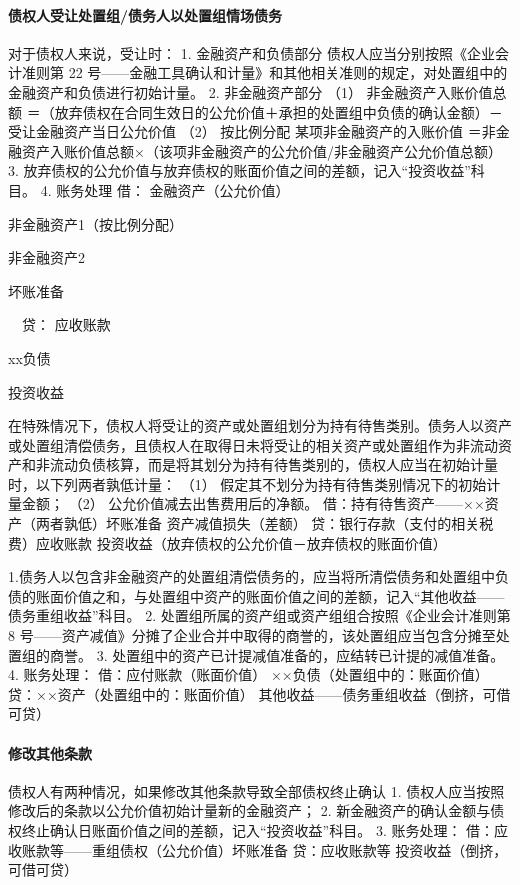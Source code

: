 \documentclass[UTF8,12pt]{ctexart}
\newenvironment{Dr}{\noindent 借：}{\par}
\newenvironment{Cr}{\noindent \ \ 贷：}{\par}
\numberwithin{equation}{section} %
\numberwithin{figure}{section}
\numberwithin{table}{section}
\begin{document}
	\paragraph{债权人受让处置组/债务人以处置组情场债务}
	对于债权人来说，受让时：
	1.	金融资产和负债部分
	债权人应当分别按照《企业会计准则第 22 号——金融工具确认和计量》和其他相关准则的规定，对处置组中的金融资产和负债进行初始计量。
	2.	非金融资产部分
	（1）	非金融资产入账价值总额
	＝（放弃债权在合同生效日的公允价值＋承担的处置组中负债的确认金额）－受让金融资产当日公允价值
	（2）	按比例分配
	某项非金融资产的入账价值
	＝非金融资产入账价值总额×（该项非金融资产的公允价值/非金融资产公允价值总额）
	3.	放弃债权的公允价值与放弃债权的账面价值之间的差额，记入“投资收益”科目。
	4.	账务处理
	\begin{Dr}
		金融资产（公允价值）
		
		非金融资产1（按比例分配）
		
		非金融资产2
		
		坏账准备
	\end{Dr}
	\begin{Cr}
		应收账款
		
		xx负债
		
		投资收益
	\end{Cr}
	
	在特殊情况下，债权人将受让的资产或处置组划分为持有待售类别。债务人以资产或处置组清偿债务，且债权人在取得日未将受让的相关资产或处置组作为非流动资产和非流动负债核算，而是将其划分为持有待售类别的，债权人应当在初始计量时，以下列两者孰低计量：
	（1）	假定其不划分为持有待售类别情况下的初始计量金额；
	（2）	公允价值减去出售费用后的净额。
	借：持有待售资产——××资产（两者孰低）坏账准备
	资产减值损失（差额）
	贷：银行存款（支付的相关税费）应收账款
	投资收益（放弃债权的公允价值－放弃债权的账面价值）
	
	1.债务人以包含非金融资产的处置组清偿债务的，应当将所清偿债务和处置组中负债的账面价值之和，与处置组中资产的账面价值之间的差额，记入“其他收益——债务重组收益”科目。
	2.	处置组所属的资产组或资产组组合按照《企业会计准则第 8 号——资产减值》分摊了企业合并中取得的商誉的，该处置组应当包含分摊至处置组的商誉。
	3.	处置组中的资产已计提减值准备的，应结转已计提的减值准备。
	4.	账务处理：
	借：应付账款（账面价值）
	××负债（处置组中的：账面价值） 贷：××资产（处置组中的：账面价值）
	其他收益——债务重组收益（倒挤，可借可贷）
	
	\paragraph{修改其他条款}
	债权人有两种情况，如果修改其他条款导致全部债权终止确认
	1.	债权人应当按照修改后的条款以公允价值初始计量新的金融资产；
	2.	新金融资产的确认金额与债权终止确认日账面价值之间的差额，记入“投资收益”科目。
	3.	账务处理：
	借：应收账款等——重组债权（公允价值）坏账准备
	贷：应收账款等
	投资收益（倒挤，可借可贷）
	
\end{document}

